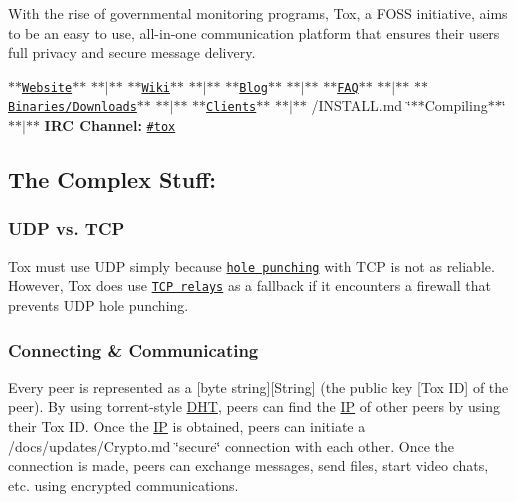  



With the rise of governmental monitoring programs, Tox, a F\+O\+S\+S initiative, aims to be an easy to use, all-\/in-\/one communication platform that ensures their users full privacy and secure message delivery.~\newline
 ~\newline


\href{https://tox.chat}{\tt $\ast$$\ast$\+Website$\ast$$\ast$} $\ast$$\ast$$\vert$$\ast$$\ast$ \href{https://wiki.tox.chat/}{\tt $\ast$$\ast$\+Wiki$\ast$$\ast$} $\ast$$\ast$$\vert$$\ast$$\ast$ \href{https://blog.tox.chat/}{\tt $\ast$$\ast$\+Blog$\ast$$\ast$} $\ast$$\ast$$\vert$$\ast$$\ast$ \href{https://wiki.tox.chat/doku.php?id=users:faq}{\tt $\ast$$\ast$\+F\+A\+Q$\ast$$\ast$} $\ast$$\ast$$\vert$$\ast$$\ast$ \href{https://wiki.tox.chat/doku.php?id=developers:binaries}{\tt $\ast$$\ast$\+Binaries/\+Downloads$\ast$$\ast$} $\ast$$\ast$$\vert$$\ast$$\ast$ \href{https://wiki.tox.chat/doku.php?id=clients}{\tt $\ast$$\ast$\+Clients$\ast$$\ast$} $\ast$$\ast$$\vert$$\ast$$\ast$ /\+I\+N\+S\+T\+A\+L\+L.md \char`\"{}$\ast$$\ast$\+Compiling$\ast$$\ast$\char`\"{} $\ast$$\ast$$\vert$$\ast$$\ast$ {\bfseries I\+R\+C Channel\+:} \href{https://webchat.freenode.net/?channels=tox}{\tt \#tox}

\subsection*{The Complex Stuff\+:}

\subsubsection*{U\+D\+P vs. T\+C\+P}

Tox must use U\+D\+P simply because \href{https://en.wikipedia.org/wiki/UDP_hole_punching}{\tt hole punching} with T\+C\+P is not as reliable. However, Tox does use \href{/docs/TCP_Network.txt}{\tt T\+C\+P relays} as a fallback if it encounters a firewall that prevents U\+D\+P hole punching.

\subsubsection*{Connecting \& Communicating}

Every peer is represented as a \mbox{[}byte string\mbox{]}\mbox{[}String\mbox{]} (the public key \mbox{[}Tox I\+D\mbox{]} of the peer). By using torrent-\/style \hyperlink{struct_d_h_t}{D\+H\+T}, peers can find the \hyperlink{struct_i_p}{I\+P} of other peers by using their Tox I\+D. Once the \hyperlink{struct_i_p}{I\+P} is obtained, peers can initiate a /docs/updates/\+Crypto.md \char`\"{}secure\char`\"{} connection with each other. Once the connection is made, peers can exchange messages, send files, start video chats, etc. using encrypted communications.

